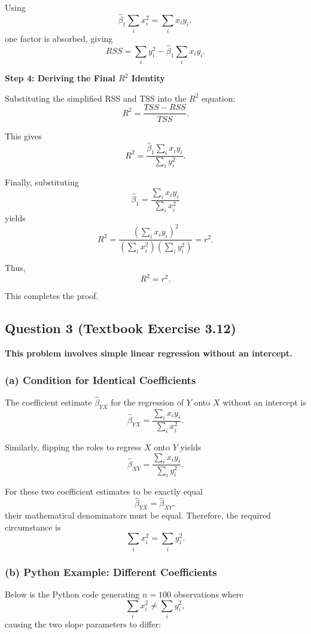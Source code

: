 \documentclass[12pt,a4paper]{article}
\begin{document}
Using
\[
\hat{\beta}_1\sum_i x_i^2=\sum_i x_i y_i,
\]
one factor is absorbed, giving
\[
RSS=\sum_i y_i^2-\hat{\beta}_1\sum_i x_i y_i.
\]

\textbf{Step 4: Deriving the Final $R^2$ Identity}

Substituting the simplified RSS and TSS into the $R^2$ equation:
\[
R^2=\frac{TSS-RSS}{TSS}.
\]

This gives
\[
R^2=
\frac{\hat{\beta}_1\sum_i x_i y_i}
{\sum_i y_i^2}.
\]

Finally, substituting
\[
\hat{\beta}_1=
\frac{\sum_i x_i y_i}{\sum_i x_i^2}
\]
yields
\[
R^2=
\frac{\left(\sum_i x_i y_i\right)^2}
{\left(\sum_i x_i^2\right)\left(\sum_i y_i^2\right)}
=r^2.
\]

Thus,
\[
\boxed{R^2=r^2}.
\]

This completes the proof.

\subsection*{Question 3 (Textbook Exercise 3.12)}

\textbf{This problem involves simple linear regression without an intercept.}

\subsubsection*{(a) Condition for Identical Coefficients}

The coefficient estimate $\hat{\beta}_{YX}$ for the regression of $Y$ onto $X$ without an intercept is
\[
\hat{\beta}_{YX}
=
\frac{\sum_i x_i y_i}{\sum_i x_i^2}.
\]

Similarly, flipping the roles to regress $X$ onto $Y$ yields
\[
\hat{\beta}_{XY}
=
\frac{\sum_i x_i y_i}{\sum_i y_i^2}.
\]

For these two coefficient estimates to be exactly equal
\[
\hat{\beta}_{YX}=\hat{\beta}_{XY},
\]
their mathematical denominators must be equal. Therefore, the required circumstance is
\[
\boxed{\sum_i x_i^2=\sum_i y_i^2}.
\]

\subsubsection*{(b) Python Example: Different Coefficients}

Below is the Python code generating $n=100$ observations where
\[
\sum_i x_i^2\neq\sum_i y_i^2,
\]
causing the two slope parameters to differ:
\end{document}
